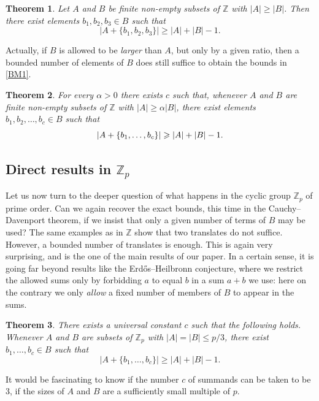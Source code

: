 \documentclass[12pt,reqno]{amsart}
\newtheorem{theorem}{Theorem}
\theoremstyle{definition}
\renewcommand\leq{\leqslant}
\renewcommand\geq{\geqslant}
\renewcommand\ge{\geqslant}
\begin{document}
\begin{theorem}\label{intro_three_translates_Z}
Let $A$ and $B$ be finite non-empty subsets of $\mathbb{Z}$ with $|A| \ge |B|$. Then there exist elements
$b_1,b_2,b_3 \in B$ such that
$$|A+\{b_1,b_2,b_3\}| \ge |A|+|B|-1.$$
\end{theorem}

\vspace{5pt}
Actually, if $B$ is allowed to be {\em larger} than $A$, but only by a given ratio, then
a bounded number of elements of $B$ does still suffice to obtain the bounds in \eqref{BM1}.\\

\begin{theorem}\label{intro_few_translates_Z}
For every $\alpha >0$ there exists $c$ such that, whenever $A$ and $B$ are finite non-empty subsets of
$\mathbb{Z}$ with $|A| \geq \alpha |B|$, there exist elements $b_1, b_2,
\hdots, b_c \in B$ such that
\[
\large|A+\{b_1, \hdots, b_c\}\large| \ge |A|+|B|-1.
\]
\end{theorem}


\vspace{10pt}
\subsection{Direct results in $\mathbb{Z}_p$}
Let us now turn to the deeper question of what happens in the cyclic group ${\mathbb Z}_p$ of prime order. Can we again
recover the exact bounds, this time in the Cauchy--Davenport theorem, if we insist that only
a given number of terms of $B$ may be used? The same examples as in $\mathbb Z$ show that two
translates do not suffice. However, a bounded number of translates is enough. This is again very
surprising, and is the one of the main results of our paper. In a certain sense, it is going far
beyond results like the Erd\H os--Heilbronn conjecture, where we restrict the allowed sums only by
forbidding $a$ to equal $b$ in a sum $a+b$ we use: here on the contrary we only {\em allow} a fixed number
of members of $B$ to appear in the sums.

\begin{theorem}\label{translates_of_A_Zp_equality}
There exists a universal constant $c$ such that the following holds. Whenever
$A$ and $B$ are subsets of $\mathbb{Z}_p$ with $|A|=|B|\leq p/3$,
there exist $b_1, \hdots, b_c \in B$ such that $$|A+\{b_1, \hdots, b_c\} |\geq |A|+|B|-1.$$
\end{theorem}

\vspace{5pt}
It would be fascinating to know if the number $c$ of summands can be taken to be 3, if the sizes of $A$ and $B$ are a
sufficiently small multiple of $p$.
\end{document}
